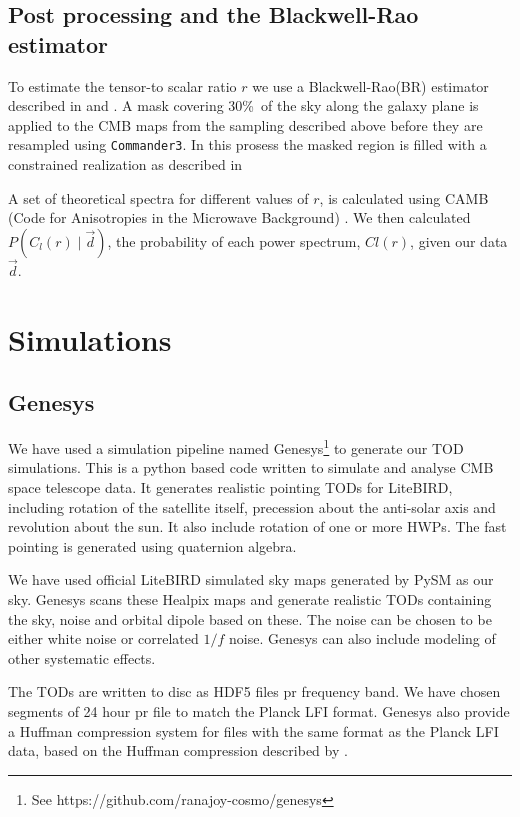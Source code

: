 \documentclass[twocolumn]{aa}
\def\commanderthree{\texttt{Commander3}}
\renewcommand{\d}[0]{\vec{d}}
\begin{document}
\subsection{Post processing and the Blackwell-Rao estimator}
To estimate the tensor-to scalar ratio $r$ we use a Blackwell-Rao(BR) estimator described in \citet{Chu_2005} and \citet{Wandelt_2004}. A mask covering 30\%\ of the sky along the galaxy plane is applied to the CMB maps from the sampling described above before they are resampled using \commanderthree. In this prosess the masked region is filled with a constrained realization as described in \citet{bp01} %

A set of theoretical spectra for different values of $r$, is calculated using CAMB (Code for Anisotropies in the Microwave Background) \cite{camb}. We then calculated $P(C_l(r)\mid\d)$, the probability of each power spectrum, $Cl(r)$, given our data $\d$. 





\section{Simulations}
\label{sec:sims}

\subsection{Genesys}
We have used a simulation pipeline named Genesys\footnote{See https://github.com/ranajoy-cosmo/genesys} to generate our TOD simulations. This is a python based code written to simulate and analyse CMB space telescope data. It generates realistic pointing TODs for LiteBIRD, including rotation of the satellite itself, precession about the anti-solar axis and revolution about the sun. It also include rotation of one or more HWPs. The fast pointing is generated using quaternion algebra.

We have used official LiteBIRD simulated sky maps generated by PySM as our sky. Genesys scans these Healpix maps and generate realistic TODs containing the sky, noise and orbital dipole based on these. The noise can be chosen to be either white noise or correlated $1/f$ noise. Genesys can also include modeling of other systematic effects. 

The TODs are written to disc as HDF5 files pr frequency band. We have chosen segments of 24 hour pr file to match the Planck LFI format. Genesys also provide a Huffman compression system for files with the same format as the Planck LFI data, based on the Huffman compression described by \citet{bp03}. 
\end{document}
